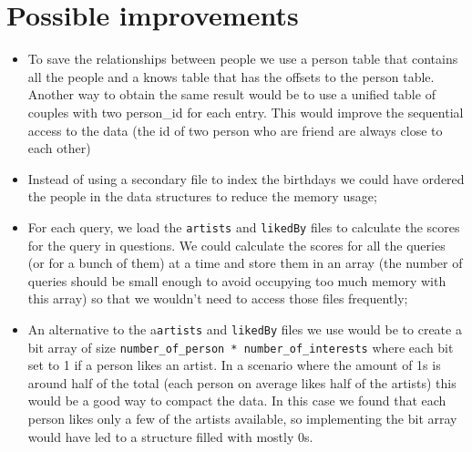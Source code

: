 \section{Possible improvements}
\begin{itemize}
    \item To save the relationships between people we use a person table that contains all the people and a knows table that has the offsets to the person table. Another way to obtain the same result would be to use a unified table of couples with two person\_id for each entry. This would improve the sequential access to the data (the id of two person who are friend are always close to each other) 
    \item Instead of using a secondary file to index the birthdays we could have ordered the people in the data structures to reduce the memory usage;
    \item For each query, we load the \texttt{artists} and \texttt{likedBy} files to calculate the scores for the query in questions. We could calculate the scores for all the queries (or for a bunch of them) at a time and store them in an array (the number of queries should be small enough to avoid occupying too much memory with this array) so that we wouldn't need to access those files frequently;
    \item An alternative to the a\texttt{artists} and \texttt{likedBy} files we use would be to create a bit array of size \texttt{number\_of\_person * number\_of\_interests} where each bit set to 1 if a person likes an artist. In a scenario where the amount of 1s is around half of the total (each person on average likes half of the artists) this would be a good way to compact the data. In this case we found that each person likes only a few of the artists available, so implementing the bit array would have led to a structure filled with mostly 0s. 
\end{itemize}





\clearpage




